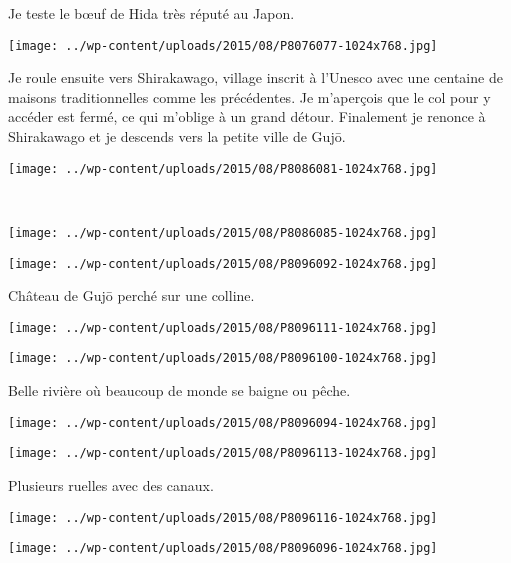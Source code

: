  Je teste le b\oe{}uf de Hida très réputé au Japon. 
\begin{center} \texttt{[image: ../wp-content/uploads/2015/08/P8076077-1024x768.jpg]} \end{center}
 \vspace{-\topsep}
\pagebreak

 Je roule ensuite vers Shirakawago, village inscrit à l'Unesco avec une centaine de maisons traditionnelles comme les précédentes. Je m'aperçois que le col pour y accéder est fermé, ce qui m'oblige à un grand détour. Finalement je renonce à Shirakawago et je descends vers la petite ville de Gujō. 
\begin{center} \texttt{[image: ../wp-content/uploads/2015/08/P8086081-1024x768.jpg]} \end{center}
~
\begin{center} \texttt{[image: ../wp-content/uploads/2015/08/P8086085-1024x768.jpg]} \end{center}
\begin{center} \texttt{[image: ../wp-content/uploads/2015/08/P8096092-1024x768.jpg]} \end{center}

  Château de Gujō perché sur une colline. 
\begin{center} \texttt{[image: ../wp-content/uploads/2015/08/P8096111-1024x768.jpg]} \end{center}
\begin{center} \texttt{[image: ../wp-content/uploads/2015/08/P8096100-1024x768.jpg]} \end{center}

 Belle rivière où beaucoup de monde se baigne ou pêche. 
\begin{center} \texttt{[image: ../wp-content/uploads/2015/08/P8096094-1024x768.jpg]} \end{center}
\begin{center} \texttt{[image: ../wp-content/uploads/2015/08/P8096113-1024x768.jpg]} \end{center}

 Plusieurs ruelles avec des canaux. 
\begin{center} \texttt{[image: ../wp-content/uploads/2015/08/P8096116-1024x768.jpg]} \end{center}
\begin{center} \texttt{[image: ../wp-content/uploads/2015/08/P8096096-1024x768.jpg]} \end{center}

